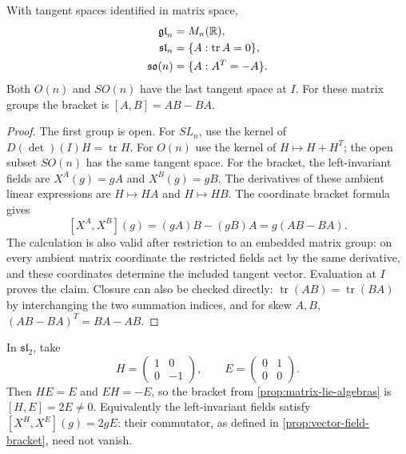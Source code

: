 \begin{proposition}\label{prop:matrix-lie-algebras}
With tangent spaces identified in matrix space,
\[
\begin{aligned}
\mathfrak{gl}_n&=M_n(\mathbb{R}),\\
\mathfrak{sl}_n&=\{A:\operatorname{tr}A=0\},\\
\mathfrak{so}(n)&=\{A:A^T=-A\}.
\end{aligned}
\]
Both $O(n)$ and $SO(n)$ have the last tangent space at $I$.
For these matrix groups the bracket is $[A,B]=AB-BA$.
\end{proposition}
\begin{proof}
The first group is open. For $SL_n$, use the kernel of
$D(\det)(I)H=\operatorname{tr}H$. For $O(n)$ use the kernel of
$H\mapsto H+H^T$; the open subset $SO(n)$ has the same tangent space.
For the bracket, the left-invariant fields are $X^A(g)=gA$ and
$X^B(g)=gB$. The derivatives of these ambient linear expressions are
$H\mapsto HA$ and $H\mapsto HB$. The coordinate bracket formula gives
\[
[X^A,X^B](g)=(gA)B-(gB)A=g(AB-BA).
\]
The calculation is also valid after restriction to an embedded matrix
group: on every ambient matrix coordinate the restricted fields act by
the same derivative, and these coordinates determine the included tangent
vector. Evaluation at $I$ proves the claim. Closure can also be checked
directly: $\operatorname{tr}(AB)=\operatorname{tr}(BA)$ by interchanging
the two summation indices, and for skew $A,B$,
$(AB-BA)^T=BA-AB$.
\end{proof}

\begin{example}\label{ex:nonzero-lie-bracket}
In $\mathfrak{sl}_2$, take
\[
H=\begin{pmatrix}1&0\\0&-1\end{pmatrix},\qquad
E=\begin{pmatrix}0&1\\0&0\end{pmatrix}.
\]
Then $HE=E$ and $EH=-E$, so the bracket from
\cref{prop:matrix-lie-algebras} is $[H,E]=2E\ne0$.
Equivalently the left-invariant fields satisfy
$[X^H,X^E](g)=2gE$: their commutator, as defined in
\cref{prop:vector-field-bracket}, need not vanish.
\end{example}

